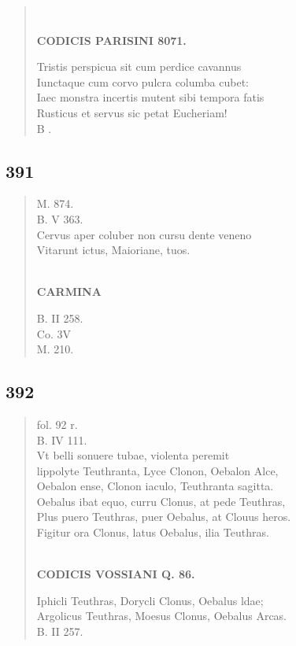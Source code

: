 \documentclass[11pt, a4paper]{report}
\begin{document}
\begin{verse}
        ﻿\pagebreak 
    \begin{center} \textbf{CODICIS PARISINI 8071.} \end{center} \marginpar{[305]} Tristis perspicua sit cum perdice cavannus \\ Iunctaque cum corvo pulcra columba cubet: \\ Iaec monstra incertis mutent sibi tempora fatis \\ Rusticus et servus sic petat Eucheriam! \\ B . \\ 
      \end{verse}
  
            \subsection*{391}
      \begin{verse}
      M. 874. \\ B. V 363. \\ Cervus aper coluber non cursu dente veneno \\ Vitarunt ictus, Maioriane, tuos. \\ 
        ﻿\pagebreak 
    \begin{center} \textbf{CARMINA} \end{center}B. II 258. \\ Co. 3V \\ M. 210. \\ 
      \end{verse}
  
            \subsection*{392}
      \begin{verse}
      fol. 92 r. \\ B. IV 111. \\ Vt belli sonuere tubae, violenta peremit \\ lippolyte Teuthranta, Lyce Clonon, Oebalon Alce, \\ Oebalon ense, Clonon iaculo, Teuthranta sagitta. \\ Oebalus ibat equo, curru Clonus, at pede Teuthras, \\ Plus puero Teuthras, puer Oebalus, at Clouus heros. \\ Figitur ora Clonus, latus Oebalus, ilia Teuthras. \\ 
        ﻿\pagebreak 
    \begin{center} \textbf{CODICIS VOSSIANI Q. 86.} \end{center} \marginpar{[307]} Iphicli Teuthras, Dorycli Clonus, Oebalus ldae; \\ Argolicus Teuthras, Moesus Clonus, Oebalus Arcas. \\ B. II 257. \\ 
      \end{verse}
  
\end{document}
